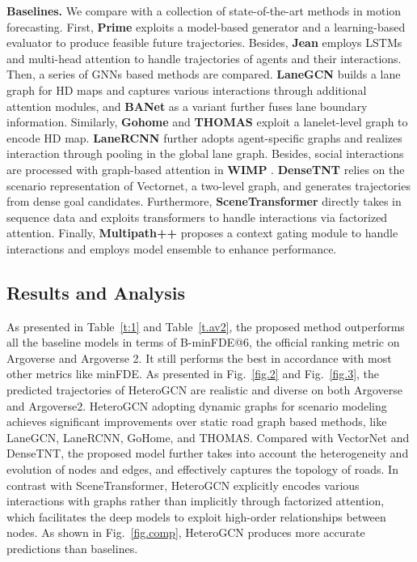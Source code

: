 \documentclass[letterpaper, 10 pt, conference]{ieeeconf}
\begin{document}
\textbf{Baselines.} We compare with a collection of state-of-the-art methods in motion forecasting.
First, \textbf{Prime} \cite{song2022learning} exploits a model-based generator and a learning-based evaluator to produce feasible future trajectories. Besides, \textbf{Jean} \cite{9197340} employs LSTMs and multi-head attention to handle trajectories of agents and their interactions. Then, a series of GNNs based methods are compared. 
\textbf{LaneGCN} \cite{liang2020learning} builds a lane graph for HD maps and captures various interactions through additional attention modules, and \textbf{BANet} \cite{DBLP:journals/corr/abs-2206-07934} as a variant further fuses lane boundary information.  Similarly, \textbf{Gohome} \cite{gilles2021gohome} and \textbf{THOMAS}\cite{gilles2022thomas} exploit a lanelet-level graph to encode HD map. 
\textbf{LaneRCNN} \cite{zeng2021lanercnn} further adopts agent-specific graphs and realizes interaction through pooling in the global lane graph. Besides,  social interactions are processed with graph-based attention in \textbf{WIMP} \cite{khandelwal2020if}. \textbf{DenseTNT} \cite{gu2021densetnt} relies on the scenario representation of Vectornet, a two-level graph, and generates trajectories from dense goal candidates. Furthermore, \textbf{SceneTransformer} \cite{ngiam2021scene} directly takes in sequence data and exploits transformers to handle interactions via factorized attention. Finally, \textbf{Multipath++} \cite{varadarajan2021multipath} proposes a context gating module to handle interactions and employs  model ensemble to enhance performance. 

\subsection{Results and Analysis}
As presented in Table~\ref{t:1} and Table~\ref{t.av2}, the proposed method outperforms all the baseline models in terms of B-minFDE@6, the official ranking metric on Argoverse and Argoverse 2. It still performs the best in accordance with most other metrics like minFDE.  
As presented in Fig.~\ref{fig.2} and Fig.~\ref{fig.3}, the predicted trajectories of HeteroGCN are realistic and diverse on both Argoverse and Argoverse2. HeteroGCN adopting dynamic graphs for scenario modeling achieves significant improvements over static road graph based methods, like LaneGCN, LaneRCNN, GoHome, and THOMAS. Compared with VectorNet and DenseTNT, the proposed model further takes into account the heterogeneity and evolution of nodes and edges, and effectively captures the topology of roads. In contrast with SceneTransformer, HeteroGCN explicitly encodes various interactions with graphs rather than implicitly through factorized attention, which facilitates the deep models to exploit high-order relationships between nodes. As shown in Fig.~\ref{fig.comp}, HeteroGCN produces more accurate predictions than baselines.
\end{document}
